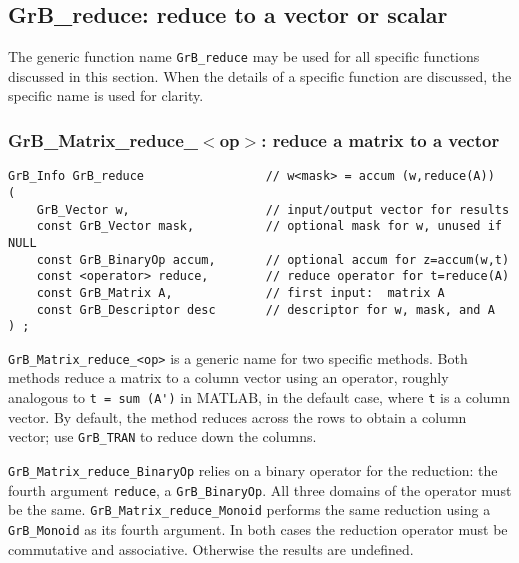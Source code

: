 \documentclass[12pt]{article}
\begin{document}
\newpage
\subsection{{\sf GrB\_reduce:} reduce to a vector or scalar} %
\label{reduce}

The generic function name \verb'GrB_reduce' may be used for all specific
functions discussed in this section.  When the details of a specific function
are discussed, the specific name is used for clarity.


\subsubsection{{\sf GrB\_Matrix\_reduce\_$<$op$>$:} reduce a matrix to a vector}
\label{reduce_to_vector}

\begin{mdframed}[userdefinedwidth=6in]
{\footnotesize
\begin{verbatim}
GrB_Info GrB_reduce                 // w<mask> = accum (w,reduce(A))
(
    GrB_Vector w,                   // input/output vector for results
    const GrB_Vector mask,          // optional mask for w, unused if NULL
    const GrB_BinaryOp accum,       // optional accum for z=accum(w,t)
    const <operator> reduce,        // reduce operator for t=reduce(A)
    const GrB_Matrix A,             // first input:  matrix A
    const GrB_Descriptor desc       // descriptor for w, mask, and A
) ;
\end{verbatim} } \end{mdframed}

\verb'GrB_Matrix_reduce_<op>' is a generic name for two specific methods.  Both
methods reduce a matrix to a column vector using an operator, roughly analogous
to \verb"t = sum (A')" in MATLAB, in the default case, where \verb't' is a
column vector.  By default, the method reduces across the rows to
obtain a column vector; use \verb'GrB_TRAN' to reduce down the columns.

\verb'GrB_Matrix_reduce_BinaryOp' relies on a binary operator for the
reduction: the fourth argument \verb'reduce', a \verb'GrB_BinaryOp'.  All three
domains of the operator must be the same.  \verb'GrB_Matrix_reduce_Monoid'
performs the same reduction using a \verb'GrB_Monoid' as its fourth argument.
In both cases the reduction operator must be commutative and associative.
Otherwise the results are undefined.
\end{document}
